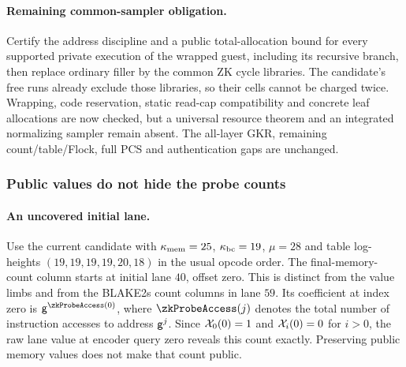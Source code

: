 \paragraph{Remaining common-sampler obligation.} Certify the address discipline and a public total-allocation bound for every supported private execution of the wrapped guest, including its recursive branch, then replace ordinary filler by the common ZK cycle libraries. The candidate's free runs already exclude those libraries, so their cells cannot be charged twice. Wrapping, code reservation, static read-cap compatibility and concrete leaf allocations are now checked, but a universal resource theorem and an integrated normalizing sampler remain absent. The all-layer GKR, remaining count/table/Flock, full PCS and authentication gaps are unchanged.

\subsubsection{Public values do not hide the probe counts}\label{sec:zk-probe-count-prefix}

\paragraph{An uncovered initial lane.} Use the current candidate with $\kappa_{\mathrm{mem}}=25$, $\kappa_{\mathrm{bc}}=19$, $\mu=28$ and table log-heights $(19,19,19,19,20,18)$ in the usual opcode order. The final-memory-count column starts at initial lane $40$, offset zero. This is distinct from the value limbs and from the BLAKE2s count columns in lane $59$. Its coefficient at index zero is $\gen^{\zkProbeAccess(0)}$, where $\zkProbeAccess(j)$ denotes the total number of instruction accesses to address $\mathsf{g}^j$. Since $\mathcal{X}_0(0)=1$ and $\mathcal{X}_i(0)=0$ for $i>0$, the raw lane value at encoder query zero reveals this count exactly. Preserving public memory values does not make that count public.

